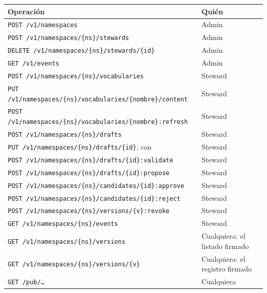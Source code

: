 \begin{longtable}{@{}L{8.8cm}L{6.6cm}@{}}
\toprule
\textbf{Operación} & \textbf{Quién} \\
\midrule
\endhead
\texttt{POST /\allowbreak{}v1/\allowbreak{}namespaces} & Admin \\
\texttt{POST /\allowbreak{}v1/\allowbreak{}namespaces/\allowbreak{}\{ns\}/\allowbreak{}stewards} & Admin \\
\texttt{DELETE /\allowbreak{}v1/\allowbreak{}namespaces/\allowbreak{}\{ns\}/\allowbreak{}stewards/\allowbreak{}\{id\}} & Admin \\
\texttt{GET /\allowbreak{}v1/\allowbreak{}events} & Admin \\
\texttt{POST /\allowbreak{}v1/\allowbreak{}namespaces/\allowbreak{}\{ns\}/\allowbreak{}vocabularies} & Steward \\
\texttt{PUT /\allowbreak{}v1/\allowbreak{}namespaces/\allowbreak{}\{ns\}/\allowbreak{}vocabularies/\allowbreak{}\{nombre\}/\allowbreak{}content} & Steward \\
\texttt{POST /\allowbreak{}v1/\allowbreak{}namespaces/\allowbreak{}\{ns\}/\allowbreak{}vocabularies/\allowbreak{}\{nombre\}:refresh} & Steward \\
\texttt{POST /\allowbreak{}v1/\allowbreak{}namespaces/\allowbreak{}\{ns\}/\allowbreak{}drafts} & Steward \\
\texttt{PUT /\allowbreak{}v1/\allowbreak{}namespaces/\allowbreak{}\{ns\}/\allowbreak{}drafts/\allowbreak{}\{id\}}, con  & Steward \\
\texttt{POST /\allowbreak{}v1/\allowbreak{}namespaces/\allowbreak{}\{ns\}/\allowbreak{}drafts/\allowbreak{}\{id\}:validate} & Steward \\
\texttt{POST /\allowbreak{}v1/\allowbreak{}namespaces/\allowbreak{}\{ns\}/\allowbreak{}drafts/\allowbreak{}\{id\}:propose} & Steward \\
\texttt{POST /\allowbreak{}v1/\allowbreak{}namespaces/\allowbreak{}\{ns\}/\allowbreak{}candidates/\allowbreak{}\{id\}:approve} & Steward \\
\texttt{POST /\allowbreak{}v1/\allowbreak{}namespaces/\allowbreak{}\{ns\}/\allowbreak{}candidates/\allowbreak{}\{id\}:reject} & Steward \\
\texttt{POST /\allowbreak{}v1/\allowbreak{}namespaces/\allowbreak{}\{ns\}/\allowbreak{}versions/\allowbreak{}\{v\}:revoke} & Steward \\
\texttt{GET /\allowbreak{}v1/\allowbreak{}namespaces/\allowbreak{}\{ns\}/\allowbreak{}events} & Steward \\
\texttt{GET /\allowbreak{}v1/\allowbreak{}namespaces/\allowbreak{}\{ns\}/\allowbreak{}versions} & Cualquiera: el listado firmado \\
\texttt{GET /\allowbreak{}v1/\allowbreak{}namespaces/\allowbreak{}\{ns\}/\allowbreak{}versions/\allowbreak{}\{v\}} & Cualquiera: el registro firmado \\
\texttt{GET /\allowbreak{}pub/\allowbreak{}…} & Cualquiera \\
\bottomrule
\end{longtable}

